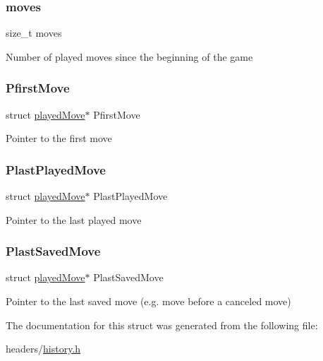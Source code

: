 \subsubsection{\texorpdfstring{moves}{moves}}
{\footnotesize\ttfamily size\+\_\+t moves}

Number of played moves since the beginning of the game \mbox{\label{structhistory_list_a6c241bff39776a3474b353f7c95e26b7}} 
\subsubsection{\texorpdfstring{Pfirst\+Move}{PfirstMove}}
{\footnotesize\ttfamily struct \hyperlink{structplayed_move}{played\+Move}$\ast$ Pfirst\+Move}

Pointer to the first move \mbox{\label{structhistory_list_add21c432af64a474240b0dcbeb21478a}} 
\subsubsection{\texorpdfstring{Plast\+Played\+Move}{PlastPlayedMove}}
{\footnotesize\ttfamily struct \hyperlink{structplayed_move}{played\+Move}$\ast$ Plast\+Played\+Move}

Pointer to the last played move \mbox{\label{structhistory_list_a06eb9e37622d16b0dfbc2360be31334b}} 
\subsubsection{\texorpdfstring{Plast\+Saved\+Move}{PlastSavedMove}}
{\footnotesize\ttfamily struct \hyperlink{structplayed_move}{played\+Move}$\ast$ Plast\+Saved\+Move}

Pointer to the last saved move (e.\+g. move before a canceled move) 

The documentation for this struct was generated from the following file\+:\begin{DoxyCompactItemize}
\item 
headers/\hyperlink{history_8h}{history.\+h}\end{DoxyCompactItemize}
